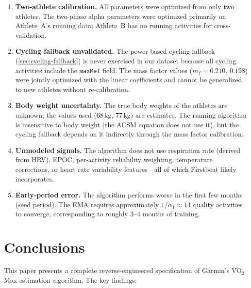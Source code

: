 \documentclass[11pt,a4paper]{article}
\begin{document}
\begin{enumerate}
    \item \textbf{Two-athlete calibration.}
    All parameters were optimized from only two athletes.
    The two-phase alpha parameters were optimized primarily on Athlete~A's running data; Athlete~B has no running activities for cross-validation.

    \item \textbf{Cycling fallback unvalidated.}
    The power-based cycling fallback (\cref{sec:cycling-fallback}) is never exercised in our dataset because all cycling activities include the \texttt{maxMet} field.
    The mass factor values ($m_f = 0.210$, $0.198$) were jointly optimized with the linear coefficients and cannot be generalized to new athletes without re-calibration.

    \item \textbf{Body weight uncertainty.}
    The true body weights of the athletes are unknown; the values used (68\,kg, 77\,kg) are estimates.
    The running algorithm is insensitive to body weight (the ACSM equation does not use it), but the cycling fallback depends on it indirectly through the mass factor calibration.

    \item \textbf{Unmodeled signals.}
    The algorithm does not use respiration rate (derived from HRV), EPOC, per-activity reliability weighting, temperature corrections, or heart rate variability features---all of which Firstbeat likely incorporates.

    \item \textbf{Early-period error.}
    The algorithm performs worse in the first few months (seed period).
    The EMA requires approximately $1/\alpha_1 \approx 14$ quality activities to converge, corresponding to roughly 3--4 months of training.
\end{enumerate}


\section{Conclusions}
\label{sec:conclusions}

This paper presents a complete reverse-engineered specification of Garmin's VO$_2$Max estimation algorithm.
The key findings:
\end{document}
